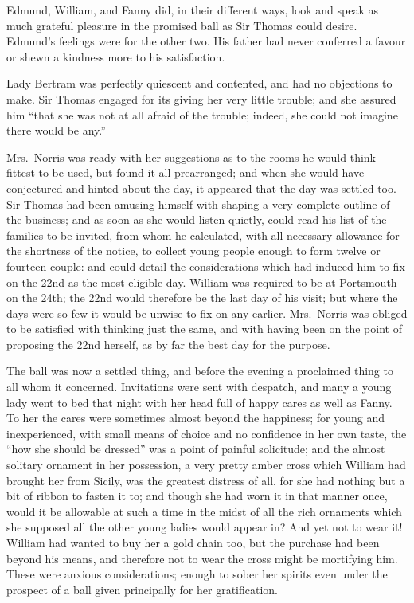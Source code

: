 \documentclass{article}
\begin{document}
Edmund, William, and Fanny did, in their different ways,
look and speak as much grateful pleasure in the promised
ball as Sir Thomas could desire.  Edmund's feelings
were for the other two.  His father had never conferred
a favour or shewn a kindness more to his satisfaction.

Lady Bertram was perfectly quiescent and contented,
and had no objections to make.  Sir Thomas engaged
for its giving her very little trouble; and she assured
him ``that she was not at all afraid of the trouble;
indeed, she could not imagine there would be any.''

Mrs.\ Norris was ready with her suggestions as to the rooms he
would think fittest to be used, but found it all prearranged;
and when she would have conjectured and hinted about
the day, it appeared that the day was settled too.
Sir Thomas had been amusing himself with shaping a very
complete outline of the business; and as soon as she
would listen quietly, could read his list of the families
to be invited, from whom he calculated, with all necessary
allowance for the shortness of the notice, to collect
young people enough to form twelve or fourteen couple:
and could detail the considerations which had induced
him to fix on the 22nd as the most eligible day.
William was required to be at Portsmouth on the 24th;
the 22nd would therefore be the last day of his visit;
but where the days were so few it would be unwise to fix
on any earlier.  Mrs.\ Norris was obliged to be satisfied
with thinking just the same, and with having been on the
point of proposing the 22nd herself, as by far the best day
for the purpose.

The ball was now a settled thing, and before the evening
a proclaimed thing to all whom it concerned.  Invitations were
sent with despatch, and many a young lady went to bed that
night with her head full of happy cares as well as Fanny.
To her the cares were sometimes almost beyond the happiness;
for young and inexperienced, with small means of choice
and no confidence in her own taste, the ``how she
should be dressed'' was a point of painful solicitude;
and the almost solitary ornament in her possession,
a very pretty amber cross which William had brought
her from Sicily, was the greatest distress of all,
for she had nothing but a bit of ribbon to fasten it to;
and though she had worn it in that manner once, would it
be allowable at such a time in the midst of all the rich
ornaments which she supposed all the other young ladies
would appear in?  And yet not to wear it!  William had
wanted to buy her a gold chain too, but the purchase had
been beyond his means, and therefore not to wear the cross
might be mortifying him.  These were anxious considerations;
enough to sober her spirits even under the prospect
of a ball given principally for her gratification.
\end{document}
